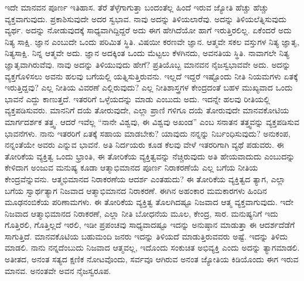 ಇದೇ ಮಾನವನ ಪೂರ್ಣ ಇತಿಹಾಸ. ತೆರೆ ತೆಳ್ಳೆಗಾಗುತ್ತಾ ಬಂದಂತೆಲ್ಲ ಹಿಂದೆ ಇರುವ ಜ್ಯೋತಿ ಹೆಚ್ಚು ಹೆಚ್ಚು ವ್ಯಕ್ತವಾಗುವುದು. ಪ್ರಕಾಶಿಸುವುದೇ ಅದರ ಸ್ವಭಾವ. ನಾವು ಅದನ್ನು ತಿಳಿಯಲಾರೆವು. ಅದನ್ನು ತಿಳಿಯಲೆತ್ನಿಸುವುದು ವ್ಯರ್ಥ. ಅದನ್ನು ನೋಡುವುದಕ್ಕೆ ಸಾಧ್ಯವಾಗಿದ್ದಿದ್ದರೆ ಅದು ಈಗ ಹೇಗಿದೆಯೋ ಹಾಗೆ ಇರುತ್ತಿರಲಿಲ್ಲ. ಏಕೆಂದರೆ ಅದು ನಿತ್ಯ ಸಾಕ್ಷಿ. ಜ್ಞಾನ ಎಂಬುದೇ ಒಂದು ಪರಿಮಿತ ಸ್ಥಿತಿ. ವಿಷಯೀ ಕರಣವೇ ಜ್ಞಾನ. ಆತ್ಮವೇ ಸಕಲ ವಸ್ತುಗಳ ನಿತ್ಯ ಜ್ಞಾತೃ, ನಿತ್ಯಸಾಕ್ಷಿ. ನಿನ್ನ ಆತ್ಮವೇ ಅದು. ಜ್ಞಾನ ಅದಕ್ಕಿಂತ ಒಂದು ಮೆಟ್ಟಲು ಕೆಳಗಿನದು, ಅವನತಿಯ ಸ್ಥಿತಿ. ನಾವಾಗಲೇ ನಿತ್ಯ ಜ್ಞಾತೃವಾಗಿರುವೆವು. ನಾವು ಅದನ್ನು ತಿಳಿಯುವುದು ಹೇಗೆ? ಪ್ರತಿಯೊಬ್ಬ ಮಾನವನ ನೈಜಸ್ವಭಾವವೇ ಅದು. ಅದನ್ನು ವ್ಯಕ್ತಗೊಳಿಸಲು ಅವನು ಹಲವು ಬಗೆಯಲ್ಲಿ ಯತ್ನಿಸುತ್ತಿರುವನು. ಇಲ್ಲದೆ ಇದ್ದರೆ ಇಷ್ಟೊಂದು ನೀತಿ ನಿಯಮಗಳು ಏತಕ್ಕೆ ಇರುತ್ತಿದ್ದವು? ಎಲ್ಲ ನೀತಿಯ ವಿವರಣೆ ಎಲ್ಲಿರುವುದು? ಎಲ್ಲ ನೀತಿಶಾಸ್ತ್ರಗಳ ಕೇಂದ್ರದಂತೆ ಬಹಳ ಮುಖ್ಯವಾದ ಒಂದು ಭಾವನೆ ಎದ್ದು ಕಾಣುತ್ತದೆ. ಇತರರಿಗೆ ಒಳ್ಳೆಯದನ್ನು ಮಾಡು ಎಂಬುದು ಅದು. ಇದನ್ನೇ ಹಲವು ರೀತಿಯಲ್ಲಿ ವ್ಯಕ್ತಪಡಿಸುವರು. ಮಾನನಿಗೆ ದಯೆ ತೋರುವುದೇ, ಎಲ್ಲಾ ಪ್ರಾಣಿ ಗಳಿಗೂ ದಯೆ ತೋರುವುದೇ ಮಾನವಕೋಟಿಯ ಮಾರ್ಗದರ್ಶಕ ತತ್ತ್ವ. ಆದರೆ ಇವೆಲ್ಲ “ನಾನೇ ವಿಶ್ವವು, ಈ ವಿಶ್ವವು ಅಖಂಡ” ಎಂಬ ಸನಾತನ ತತ್ತ್ವವನ್ನು ವ್ಯಕ್ತಪಡಿಸುವ ಭಾವನೆಗಳು. ನಾನು ಇತರರಿಗೆ ಏತಕ್ಕೆ ಸಹಾಯ ಮಾಡಬೇಕು? ಯಾವುದು ನನ್ನನ್ನು ನಿರ್ಬಂಧಿಸುವುದು? ಅನುಕಂಪ, ನನ್ನಂತೆಯೇ ಅವರು ಎನ್ನುವ ಭಾವನೆ. ಅತಿ ನಿರ್ದಯರು ಕೂಡ ಕೆಲವು ವೇಳೆ ಇತರರಿಗಾಗಿ ವ್ಯಥೆ ಪಡುವರು. ಈ ತೋರಿಕೆಯ ವ್ಯಕ್ತಿತ್ವ ಒಂದು ಭ್ರಾಂತಿ, ಈ ತೋರಿಕೆಯ ವ್ಯಕ್ತಿತ್ವವನ್ನು ನೆಚ್ಚಿರುವುದು ಅತಿ ಹೇಯವಾದುದು ಎಂಬುದನ್ನು ಕೇಳಿದಾಗ ಅಂಜುವ ಮನುಷ್ಯ ಕೂಡಾ ಆತ್ಮಾಭಿಮಾನದ ಪೂರ್ಣ ನಿರಾಕರಣೆಯೆ ಎಲ್ಲ ಬಗೆಯ ನೀತಿಯ ಕೇಂದ್ರವೆನ್ನುವನು. ಆತ್ಮಭಿಮಾನದ ನಿರಾಕರಣೆಯ ಆದರ್ಶ ಎಂತಹುದು? ಈ ತೋರಿಕೆಯ ವ್ಯಕ್ತಿತ್ವದ ತ್ಯಾಗ, ಎಲ್ಲಾ ಬಗೆಯ ಸ್ವಾರ್ಥತ್ಯಾಗ ನಿಜವಾದ ಆತ್ಮಾಭಿಮಾನದ ನಿರಾಕರಣೆ. ಈಗಿನ ಅಹಂಕಾರ ಮಮಕಾರಗಳು ಹಿಂದಿನ ಮೂಢನಂಬಿಕೆಯ ಪರಿಣಾಮಗಳು. ಈ ತೋರಿಕೆಯ ವ್ಯಕ್ತಿತ್ವ ತೊಲಗಿದಷ್ಟೂ ನಿಜವಾದ ಆತ್ಮ ವ್ಯಕ್ತವಾಗುವುದು. ಇದೇ ನಿಜವಾದ ಆತ್ಮಾಭಿಮಾನದ ನಿರಾಕರಣೆ, ಎಲ್ಲಾ ನೀತಿ ಬೋಧನೆಯ ಮೂಲ, ಕೇಂದ್ರ, ಸಾರ. ಮನುಷ್ಯನಿಗೆ ಇದು ಗೊತ್ತಿರಲಿ, ಗೊತ್ತಿಲ್ಲದೆ ಇರಲಿ, ಇಡೀ ಪ್ರಪಂಚವು ಸಾಧ್ಯವಾದಷ್ಟೂ ಇದನ್ನು ಅನುಷ್ಠಾನ ಮಾಡುತ್ತಾ ಈ ಆದರ್ಶದೆಡೆಗೆ ಸಾಗುತ್ತಿದೆ. ಮಾನವಕೊಟಿಯ ಬಹುಮಂದಿ ಜನರು ಇದನ್ನು ತಿಳಿಯದೆ ಮಾಡುತ್ತಿರುವವರು ಅಷ್ಟೆ. ಇದನ್ನು ತಿಳಿದು ಮಾಡಲಿ. ನಾನು ನನ್ನದೆಂಬುದು ನಿಜವಾದ ಆತ್ಮವಲ್ಲ, ಇದೊಂದು ಸಂಕುಚಿತ ಅಭಿವ್ಯಕ್ತಿ ಎಂದು ಅದನ್ನು ತ್ಯಾಗಮಾಡಲಿ. ಅತೀತದ, ಅನಂತ ಸತ್ಯದ ಕ್ಷಣಿಕ ನೋಟವೊಂದು, ಸರ್ವವೂ ಆಗಿರುವ ಅನಂತ ಜ್ಯೋತಿಯ ಕಿಡಿಯೊಂದು ಈಗ ಇರುವ ಮಾನವ. ಅನಂತವೇ ಅವನ ನೈಜಸ್ವರೂಪ.

